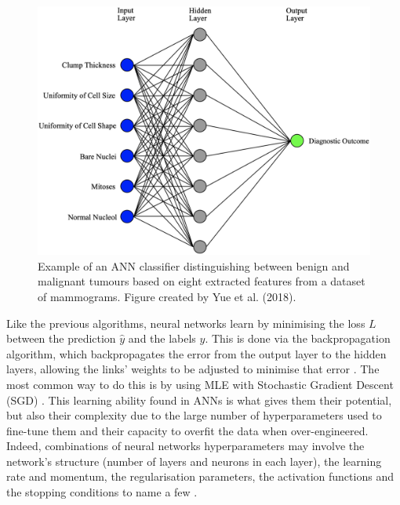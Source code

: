 \begin{figure}[ht]
\centerline{\includegraphics[width=\textwidth]{Dissertation/figures/litsurvey/ann.png}}
\caption{\label{fig:litsurvey-ann-example}Example of an ANN classifier distinguishing between benign and malignant tumours based on eight extracted features from a dataset of mammograms. Figure created by Yue et al. (2018).}
\end{figure}

Like the previous algorithms, neural networks learn by minimising the loss $L$ between the prediction $\hat{y}$ and the labels $y$. This is done via the backpropagation algorithm, which backpropagates the error from the output layer to the hidden layers, allowing the links' weights to be adjusted to minimise that error \citep{russell2002artificial}. The most common way to do this is by using MLE with Stochastic Gradient Descent (SGD) \citep{Litjens2017}. This learning ability found in ANNs is what gives them their potential, but also their complexity due to the large number of hyperparameters used to fine-tune them and their capacity to overfit the data when over-engineered. Indeed, combinations of neural networks hyperparameters may involve the network's structure (number of layers and neurons in each layer), the learning rate and momentum, the regularisation parameters, the activation functions and the stopping conditions to name a few \citep{sklearn-MLP-2019}.\\

